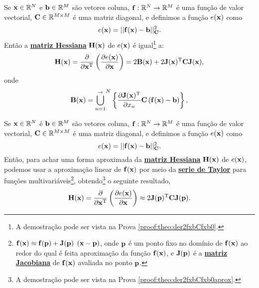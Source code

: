 \begin{theorem}\label{theo:der2fxbCfxb0}
Se
$\VECTOR{x}\in \mathbb{R}^N$ e 
$\VECTOR{b}\in \mathbb{R}^M$ são vetores coluna,  
$\VECTOR{f}: \mathbb{R}^{N}\rightarrow \mathbb{R}^{M}$ é uma função de valor vectorial,
$\MATRIX{C} \in \mathbb{R}^{M\times M}$ é uma matriz diagonal, e
definimos a função $e(\VECTOR{x})$ como
\begin{equation}
e(\VECTOR{x})= ||\VECTOR{f}(\VECTOR{x})-\VECTOR{b}||_{\MATRIX{C}}^2.
\end{equation}
Então a \hyperref[def:hessian]{\textbf{matriz Hessiana}} $\MATRIX{H}(\VECTOR{x})$ 
de $e(\VECTOR{x})$ é igual\footnote{A demostração pode ser vista na Prova \ref{proof:theo:der2fxbCfxb0}.} a:
\begin{equation}
\MATRIX{H}(\VECTOR{x}) = \frac{\partial}{\partial \VECTOR{x}^{\transpose}}\left(  
\frac{\partial e(\VECTOR{x}) }{\partial \VECTOR{x}} \right) = 2 \MATRIX{B}(\VECTOR{x})
+2 \MATRIX{J}(\VECTOR{x})^{\transpose}\MATRIX{C} \MATRIX{J}(\VECTOR{x}),
\end{equation}
onde 
\begin{equation}
 \MATRIX{B}(\VECTOR{x})=
{\bigcup\limits_{n=1}^{ \rightarrow }}^{N}\left\{ \frac{\partial \MATRIX{J}(\VECTOR{x})^{\transpose} }{\partial x_{n}} \MATRIX{C} \left( \VECTOR{f}(\VECTOR{x})-\VECTOR{b}\right) \right\},
\end{equation}
\end{theorem}

\begin{theorem}\label{theo:der2fxbCfxb0aprox}
Se 
$\VECTOR{x}\in \mathbb{R}^N$ é  
$\VECTOR{b}\in \mathbb{R}^M$ são vetores coluna,  
$\VECTOR{f}: \mathbb{R}^{N}\rightarrow \mathbb{R}^{M}$ é uma função de valor vectorial,
$\MATRIX{C} \in \mathbb{R}^{M\times M}$ é uma matriz diagonal, e 
definimos a função $e(\VECTOR{x})$ como
\begin{equation}
e(\VECTOR{x})= ||\VECTOR{f}(\VECTOR{x})-\VECTOR{b}||_{\MATRIX{C}}^2.
\end{equation}
Então, para achar uma forma aproximada da \hyperref[def:hessian]{\textbf{matriz Hessiana}} $\MATRIX{H}(\VECTOR{x})$ de $e(\VECTOR{x})$, 
podemos usar a aproximação linear de $\VECTOR{f}(\VECTOR{x})$ por meio da \hyperref[def:taylor]{\textbf{serie de Taylor}} 
para funções multivariáveis\footnote{ $\VECTOR{f}(\VECTOR{x})\approx \VECTOR{f}(\VECTOR{p}) + \MATRIX{J}(\VECTOR{p})$ $\left(\VECTOR{x}-\VECTOR{p}\right)$,
onde $\VECTOR{p}$ é um ponto fixo no domínio de $\VECTOR{f}(\VECTOR{x})$ ao redor do qual é feita  aproximação
da função $\VECTOR{f}(\VECTOR{x})$,
e $\MATRIX{J}(\VECTOR{p})$ é a \hyperref[def:jacobian]{\textbf{matriz Jacobiana}} de $\VECTOR{f}(\VECTOR{x})$ avaliada no ponto $\VECTOR{p}$.}, obtendo\footnote{A demostração pode ser vista na Prova \ref{proof:theo:der2fxbCfxb0aprox}.} o seguinte resultado,
\begin{equation}
\MATRIX{H}(\VECTOR{x}) = \frac{\partial}{\partial \VECTOR{x}^{\transpose}}\left(  
\frac{\partial e(\VECTOR{x}) }{\partial \VECTOR{x}} \right) \approx 
2 \MATRIX{J}(\VECTOR{p})^{\transpose}\MATRIX{C} \MATRIX{J}(\VECTOR{p}).
\end{equation}


\end{theorem}


